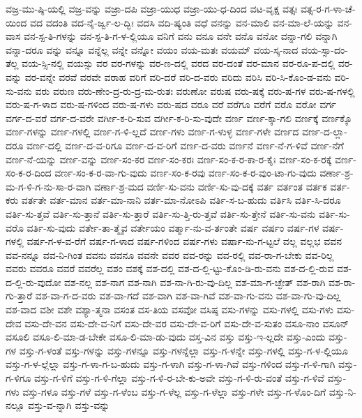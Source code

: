 {ವಜ್ರ-ಮು-ಷ್ಠಿ-ಯಲ್ಲಿ
ವಜ್ರ-ವನ್ನು
ವಜ್ರಾ-ದಪಿ
ವಜ್ರಾ-ಯುಧ
ವಜ್ರಾ-ಯು-ಧ-ದಿಂದ
ವಟ-ವೃಕ್ಷ
ವತ್ಸಃ
ವತ್ಸ-ರ-ಗ-ಳಾ-ಚೆ-ಯಿಂದ
ವದ
ವದಂತಿ
ವದ-ನೈ-ರ್ಜ್ವ-ಲ-ದ್ಭಿಃ
ವದಸಿ
ವದಿ-ಷ್ಯಂತಿ
ವಧೆ
ವನನ್ನು
ವನ-ಮಾಲಿ
ವನ-ಮಾ-ಲೆ-ಯನ್ನು
ವನ-ವಾಸ
ವನ-ಸ್ಪ-ತಿ-ಗಳನ್ನು
ವನ-ಸ್ಪ-ತಿ-ಗ-ಳ-ಲ್ಲಿಯೂ
ವನಿಗೆ
ವನು
ವನೂ
ವನೇ
ವನೊ
ವನೋ
ವನ್ನಾ-ಗಲಿ
ವನ್ನಾಗಿ
ವನ್ನಾ-ದರೂ
ವನ್ನು
ವನ್ನೂ
ವನ್ನೆಲ್ಲ
ವನ್ನೇ
ವನ್ನೋ
ವಯಂ
ವಯ-ಮತಃ
ವಯಮ್
ವಯ-ಸ್ಕ-ನಾದ
ವಯ-ಸ್ಸಾ-ದಂ-ತೆಲ್ಲ
ವಯ-ಸ್ಸಿ-ನಲ್ಲಿ
ವಯಸ್ಸು
ವರ
ವರ-ಗಳನ್ನು
ವರ-ಣ-ದಲ್ಲಿ
ವರದ
ವರ-ದಂತೆ
ವರ-ಮಾನ
ವರ-ರೂ-ಪ-ದಲ್ಲಿ
ವರ-ವನ್ನು
ವರ-ವನ್ನೇ
ವರವೆ
ವರವೇ
ವರಾಹ
ವರಿಗೆ
ವರಿ-ದರೆ
ವರಿ-ದ-ವರು
ವರಿದು
ವರಿಸಿ
ವರಿ-ಸಿ-ಕೊಂ-ಡ-ವನು
ವರಿ-ಸು-ವನು
ವರು
ವರುಣ
ವರು-ಣೇಂ-ದ್ರ-ರು-ದ್ರ-ಮ-ರುತಃ
ವರುಣೋ
ವರುಷ
ವರು-ಷಕ್ಕೆ
ವರು-ಷ-ಗಳ
ವರು-ಷ-ಗಳಲ್ಲಿ
ವರು-ಷ-ಗ-ಳಾದ
ವರು-ಷ-ಗಳಿಂದ
ವರು-ಷ-ಗಳು
ವರು-ಷದ
ವರೂ
ವರೆ
ವರೆಗೂ
ವರೆಗೆ
ವರೊ
ವರೋ
ವರ್ಗ
ವರ್ಗ-ದ-ವರೆ
ವರ್ಗ-ದ-ವರೇ
ವರ್ಗೀ-ಕ-ರಿ-ಸುವ
ವರ್ಗೀ-ಕ-ರಿ-ಸು-ವುದೇ
ವರ್ಣ
ವರ್ಣ-ಕ್ಕಾ-ಗಲಿ
ವರ್ಣಕ್ಕೆ
ವರ್ಣಕ್ಕೊ
ವರ್ಣ-ಗಳನ್ನು
ವರ್ಣ-ಗಳಲ್ಲಿ
ವರ್ಣ-ಗ-ಳಿ-ಲ್ಲದೆ
ವರ್ಣ-ಗಳು
ವರ್ಣ-ಗ-ಳುಳ್ಳ
ವರ್ಣ-ಗಳೇ
ವರ್ಣದ
ವರ್ಣ-ದ-ಲ್ಲಾ-ದರೂ
ವರ್ಣ-ದಲ್ಲಿ
ವರ್ಣ-ದ-ವ-ರಿಗೂ
ವರ್ಣ-ದ-ವ-ರಿಗೆ
ವರ್ಣ-ದ-ವರು
ವರ್ಣನೆ
ವರ್ಣ-ನೆ-ಗ-ಳಿವೆ
ವರ್ಣ-ನೆಗೆ
ವರ್ಣ-ನೆ-ಯನ್ನು
ವರ್ಣ-ವನ್ನು
ವರ್ಣ-ಸಂ-ಕರ
ವರ್ಣ-ಸಂ-ಕರಃ
ವರ್ಣ-ಸಂ-ಕ-ರ-ಕಾ-ರ-ಕೈಃ
ವರ್ಣ-ಸಂ-ಕ-ರಕ್ಕೆ
ವರ್ಣ-ಸಂ-ಕ-ರ-ದಿಂದ
ವರ್ಣ-ಸಂ-ಕ-ರ-ವಾ-ಗು-ವುದು
ವರ್ಣ-ಸಂ-ಕ-ರವು
ವರ್ಣ-ಸಂ-ಕ-ರ-ವುಂ-ಟಾ-ಗು-ವುದು
ವರ್ಣಾ-ಶ್ರ-ಮ-ಗ-ಳಿ-ಗ-ನು-ಸಾ-ರ-ವಾಗಿ
ವರ್ಣಾ-ಶ್ರ-ಮದ
ವರ್ಣಿ-ಸು-ವನು
ವರ್ಣಿ-ಸು-ವು-ದಕ್ಕೆ
ವರ್ತ
ವರ್ತಂತ
ವರ್ತಕ
ವರ್ತ-ಕರು
ವರ್ತತೇ
ವರ್ತ-ಮಾನ
ವರ್ತ-ಮಾ-ನಾನಿ
ವರ್ತ-ಮಾ-ನೋಽಪಿ
ವರ್ತಿ-ಸ-ಬ-ಹುದು
ವರ್ತಿಸಿ
ವರ್ತಿ-ಸಿ-ದರೂ
ವರ್ತಿ-ಸು-ತ್ತವೆ
ವರ್ತಿ-ಸು-ತ್ತಾನೆ
ವರ್ತಿ-ಸು-ತ್ತಾರೆ
ವರ್ತಿ-ಸು-ತ್ತಿ-ರು-ತ್ತವೆ
ವರ್ತಿ-ಸು-ತ್ತೇನೆ
ವರ್ತಿ-ಸು-ವನು
ವರ್ತಿ-ಸು-ವರೊ
ವರ್ತಿ-ಸು-ವುದು
ವರ್ತೇ-ತಾ-ತ್ಮೈವ
ವರ್ತೇಯಂ
ವರ್ತ್ಮಾ-ನು-ವ-ರ್ತಂತೇ
ವರ್ಷ
ವರ್ಷಂ
ವರ್ಷ-ಗಳ
ವರ್ಷ-ಗಳಲ್ಲಿ
ವರ್ಷ-ಗ-ಳ-ವ-ರೆಗೆ
ವರ್ಷ-ಗ-ಳಾದ
ವರ್ಷ-ಗಳಿಂದ
ವರ್ಷ-ಗಳು
ವರ್ಷಾ-ನು-ಗ-ಟ್ಟಲೆ
ವಲ್ಲ
ವಲ್ಲಭ
ವವನ
ವವ-ನನ್ನೂ
ವವ-ನಿ-ಗಿಂತ
ವವನು
ವವನೂ
ವವನೇ
ವವರ
ವವ-ರನ್ನು
ವವ-ರಲ್ಲಿ
ವವ-ರಾ-ಗ-ಬೇಕು
ವವ-ರಿಲ್ಲ
ವವರು
ವವರೂ
ವವರೆ
ವವರೆಲ್ಲ
ವಶಂ
ವಶಕ್ಕೆ
ವಶ-ದಲ್ಲಿ
ವಶ-ದ-ಲ್ಲಿ-ಟ್ಟು-ಕೊಂ-ಡಿ-ರು-ವನು
ವಶ-ದ-ಲ್ಲಿ-ರುವ
ವಶ-ದ-ಲ್ಲಿ-ರು-ವುದೋ
ವಶ-ನಲ್ಲ
ವಶ-ನಾಗ
ವಶ-ನಾಗಿ
ವಶ-ನಾ-ಗಿ-ರು-ವು-ದಿಲ್ಲ
ವಶ-ಮಾ-ಗ-ಚ್ಛೇತ್
ವಶ-ರಾಗಿ
ವಶ-ರಾ-ಗು-ತ್ತಾರೆ
ವಶ-ವಾ-ಗ-ದ-ವರು
ವಶ-ವಾ-ಗದೆ
ವಶ-ವಾಗಿ
ವಶ-ವಾ-ಗಿವೆ
ವಶ-ವಾ-ಗು-ವನು
ವಶ-ವಾ-ಗು-ವು-ದಿಲ್ಲ
ವಶ-ವಾದ
ವಶೀ
ವಶೇ
ವಶ್ಯಾ-ತ್ಮನಾ
ವಸಂತ
ವಸ-ತಿಯ
ವಸವೋ
ವಸಿಷ್ಠ
ವಸು-ಗಳನ್ನು
ವಸು-ಗಳಲ್ಲಿ
ವಸು-ಗಳು
ವಸು-ದೇವ
ವಸು-ದೇ-ವನ
ವಸು-ದೇ-ವ-ನಿಗೆ
ವಸು-ದೇ-ವರ
ವಸು-ದೇ-ವ-ರಿಗೆ
ವಸು-ದೇ-ವ-ಸುತಂ
ವಸೂ-ನಾಂ
ವಸೂನ್
ವಸೂಲಿ
ವಸೂ-ಲಿ-ಮಾ-ಡ-ಬೇಕೇ
ವಸೂ-ಲಿ-ಮಾ-ಡು-ವುದು
ವಸ್ತ-ವಿನ
ವಸ್ತು
ವಸ್ತು-ಇ-ಲ್ಲದೇ
ವಸ್ತು-ಎಂದು
ವಸ್ತು-ಗಳ
ವಸ್ತು-ಗ-ಳಂತೆ
ವಸ್ತು-ಗಳನ್ನು
ವಸ್ತು-ಗಳನ್ನೂ
ವಸ್ತು-ಗಳನ್ನೆಲ್ಲಾ
ವಸ್ತು-ಗ-ಳನ್ನೇ
ವಸ್ತು-ಗಳಲ್ಲಿ
ವಸ್ತು-ಗ-ಳ-ಲ್ಲಿಯೂ
ವಸ್ತು-ಗ-ಳ-ಲ್ಲೆಲ್ಲಾ
ವಸ್ತು-ಗ-ಳಾ-ಗ-ಬ-ಹುದು
ವಸ್ತು-ಗ-ಳಾಗಿ
ವಸ್ತು-ಗ-ಳಾ-ಗಿವೆ
ವಸ್ತು-ಗಳಿಂದ
ವಸ್ತು-ಗ-ಳಿ-ಗಾಗಿ
ವಸ್ತು-ಗ-ಳಿಗೂ
ವಸ್ತು-ಗ-ಳಿಗೆ
ವಸ್ತು-ಗ-ಳಿ-ಗೆಲ್ಲಾ
ವಸ್ತು-ಗ-ಳಿ-ರ-ಬೇ-ಕು-ಅವೇ
ವಸ್ತು-ಗ-ಳಿ-ರು-ವಂತೆ
ವಸ್ತು-ಗ-ಳಿವೆ
ವಸ್ತು-ಗಳು
ವಸ್ತು-ಗಳೂ
ವಸ್ತು-ಗಳೆ
ವಸ್ತು-ಗ-ಳೆಂಬ
ವಸ್ತು-ಗ-ಳೆಲ್ಲ
ವಸ್ತು-ಗ-ಳೆಲ್ಲಾ
ವಸ್ತು-ಗಳೇ
ವಸ್ತು-ಗ-ಳೊಂ-ದಿಗೆ
ವಸ್ತು-ನಿ-ನಲ್ಲೂ
ವಸ್ತು-ವ-ನ್ನಾಗಿ
ವಸ್ತು-ವನ್ನು
}
